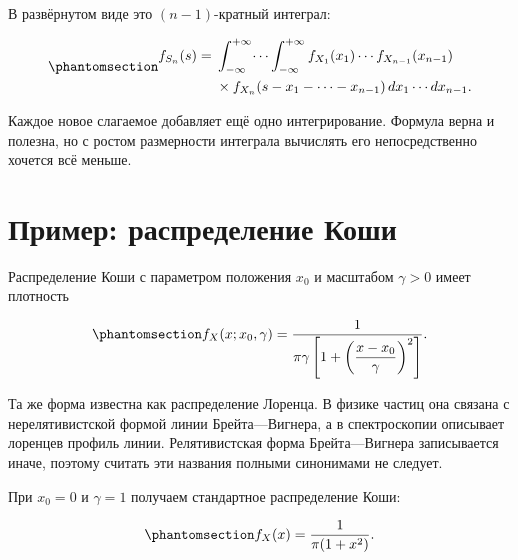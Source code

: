 \documentclass[
  russian,
  11pt,
  a4paper,
  open=any]{scrbook}
\begin{document}
В развёрнутом виде это \((n-1)\)-кратный интеграл:

\begin{equation}\protect\phantomsection\label{eq-convolution-many-integral}{
\begin{aligned}
f_{S_n}(s)
={}&\int_{-\infty}^{+\infty}\!\cdots
\int_{-\infty}^{+\infty}
f_{X_1}(x_1)\cdots f_{X_{n-1}}(x_{n-1})\\
&\times
f_{X_n}(s-x_1-\cdots-x_{n-1})
\,dx_1\cdots dx_{n-1}.
\end{aligned}
}\end{equation}

Каждое новое слагаемое добавляет ещё одно интегрирование. Формула верна
и полезна, но с ростом размерности интеграла вычислять его
непосредственно хочется всё меньше.

\section{Пример: распределение
Коши}\label{ux43fux440ux438ux43cux435ux440-ux440ux430ux441ux43fux440ux435ux434ux435ux43bux435ux43dux438ux435-ux43aux43eux448ux438}

Распределение Коши с параметром положения \(x_0\) и масштабом
\(\gamma>0\) имеет плотность

\begin{equation}\protect\phantomsection\label{eq-cauchy-density}{
f_X(x;x_0,\gamma)=
\frac{1}{
\pi\gamma\left[1+\left(\dfrac{x-x_0}{\gamma}\right)^2\right]}.
}\end{equation}

Та же форма известна как распределение Лоренца. В физике частиц она
связана с нерелятивистской формой линии Брейта---Вигнера, а в
спектроскопии описывает лоренцев профиль линии. Релятивистская форма
Брейта---Вигнера записывается иначе, поэтому считать эти названия
полными синонимами не следует.

При \(x_0=0\) и \(\gamma=1\) получаем стандартное распределение Коши:

\begin{equation}\protect\phantomsection\label{eq-standard-cauchy-density}{
f_X(x)=\frac{1}{\pi(1+x^2)}.
}\end{equation}
\end{document}
